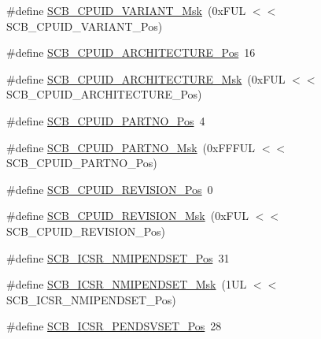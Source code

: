 \begin{DoxyCompactItemize}
\item 
\#define \mbox{\hyperlink{group___c_m_s_i_s___s_c_b_gad358dfbd04300afc1824329d128b99e8}{S\+C\+B\+\_\+\+C\+P\+U\+I\+D\+\_\+\+V\+A\+R\+I\+A\+N\+T\+\_\+\+Msk}}~(0x\+F\+U\+L $<$$<$ S\+C\+B\+\_\+\+C\+P\+U\+I\+D\+\_\+\+V\+A\+R\+I\+A\+N\+T\+\_\+\+Pos)
\item 
\#define \mbox{\hyperlink{group___c_m_s_i_s___s_c_b_gaf8b3236b08fb8e840efb682645fb0e98}{S\+C\+B\+\_\+\+C\+P\+U\+I\+D\+\_\+\+A\+R\+C\+H\+I\+T\+E\+C\+T\+U\+R\+E\+\_\+\+Pos}}~16
\item 
\#define \mbox{\hyperlink{group___c_m_s_i_s___s_c_b_gafae4a1f27a927338ae9dc51a0e146213}{S\+C\+B\+\_\+\+C\+P\+U\+I\+D\+\_\+\+A\+R\+C\+H\+I\+T\+E\+C\+T\+U\+R\+E\+\_\+\+Msk}}~(0x\+F\+U\+L $<$$<$ S\+C\+B\+\_\+\+C\+P\+U\+I\+D\+\_\+\+A\+R\+C\+H\+I\+T\+E\+C\+T\+U\+R\+E\+\_\+\+Pos)
\item 
\#define \mbox{\hyperlink{group___c_m_s_i_s___s_c_b_ga705f68eaa9afb042ca2407dc4e4629ac}{S\+C\+B\+\_\+\+C\+P\+U\+I\+D\+\_\+\+P\+A\+R\+T\+N\+O\+\_\+\+Pos}}~4
\item 
\#define \mbox{\hyperlink{group___c_m_s_i_s___s_c_b_ga98e581423ca016680c238c469aba546d}{S\+C\+B\+\_\+\+C\+P\+U\+I\+D\+\_\+\+P\+A\+R\+T\+N\+O\+\_\+\+Msk}}~(0x\+F\+F\+F\+U\+L $<$$<$ S\+C\+B\+\_\+\+C\+P\+U\+I\+D\+\_\+\+P\+A\+R\+T\+N\+O\+\_\+\+Pos)
\item 
\#define \mbox{\hyperlink{group___c_m_s_i_s___s_c_b_ga3c3d9071e574de11fb27ba57034838b1}{S\+C\+B\+\_\+\+C\+P\+U\+I\+D\+\_\+\+R\+E\+V\+I\+S\+I\+O\+N\+\_\+\+Pos}}~0
\item 
\#define \mbox{\hyperlink{group___c_m_s_i_s___s_c_b_ga2ec0448b6483f77e7f5d08b4b81d85df}{S\+C\+B\+\_\+\+C\+P\+U\+I\+D\+\_\+\+R\+E\+V\+I\+S\+I\+O\+N\+\_\+\+Msk}}~(0x\+F\+U\+L $<$$<$ S\+C\+B\+\_\+\+C\+P\+U\+I\+D\+\_\+\+R\+E\+V\+I\+S\+I\+O\+N\+\_\+\+Pos)
\item 
\#define \mbox{\hyperlink{group___c_m_s_i_s___s_c_b_ga750d4b52624a46d71356db4ea769573b}{S\+C\+B\+\_\+\+I\+C\+S\+R\+\_\+\+N\+M\+I\+P\+E\+N\+D\+S\+E\+T\+\_\+\+Pos}}~31
\item 
\#define \mbox{\hyperlink{group___c_m_s_i_s___s_c_b_ga340e3f79e9c3607dee9f2c048b6b22e8}{S\+C\+B\+\_\+\+I\+C\+S\+R\+\_\+\+N\+M\+I\+P\+E\+N\+D\+S\+E\+T\+\_\+\+Msk}}~(1\+U\+L $<$$<$ S\+C\+B\+\_\+\+I\+C\+S\+R\+\_\+\+N\+M\+I\+P\+E\+N\+D\+S\+E\+T\+\_\+\+Pos)
\item 
\#define \mbox{\hyperlink{group___c_m_s_i_s___s_c_b_gab5ded23d2ab1d5ff7cc7ce746205e9fe}{S\+C\+B\+\_\+\+I\+C\+S\+R\+\_\+\+P\+E\+N\+D\+S\+V\+S\+E\+T\+\_\+\+Pos}}~28
\item 
$$
\end{DoxyCompactItemize}
